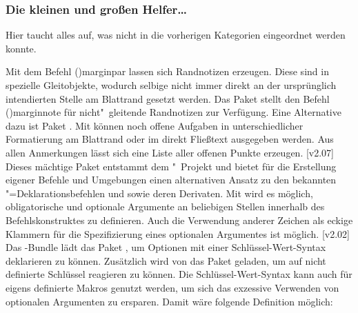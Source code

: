 \subsubsection{Die kleinen und großen Helfer\dots}

Hier taucht alles auf, was nicht in die vorherigen Kategorien eingeordnet 
werden konnte.

\begin{DeclarePackages}
  Mit dem Befehl \Macro(){marginpar} lassen sich 
  Randnotizen erzeugen. Diese sind in  spezielle Gleitobjekte, 
  wodurch selbige nicht immer direkt an der ursprünglich intendierten Stelle am 
  Blattrand gesetzt werden. Das Paket  stellt den Befehl 
  \Macro(){marginnote} für nicht"~gleitende 
  Randnotizen zur Verfügung. Eine Alternative dazu ist Paket .
  Mit  können noch offene Aufgaben in unterschiedlicher 
  Formatierung am Blattrand oder im direkt Fließtext ausgegeben werden. Aus 
  allen Anmerkungen lässt sich eine Liste aller offenen Punkte erzeugen.
  [v2.07]
  Dieses mächtige Paket entstammt dem "~Projekt und bietet 
  für die Erstellung eigener Befehle und Umgebungen einen alternativen Ansatz 
  zu den bekannten "=Deklarationsbefehlen  
  und  sowie deren Derivaten. Mit  wird 
  es möglich, obligatorische und optionale Argumente an beliebigen Stellen 
  innerhalb des Befehlskonstruktes zu definieren. Auch die Verwendung anderer 
  Zeichen als eckige Klammern für die Spezifizierung eines optionalen 
  Argumentes ist möglich.
[v2.02]
  Das \KOMAScript-Bundle lädt das Paket , um Optionen mit 
  einer Schlüssel-Wert-Syntax deklarieren zu können. Zusätzlich wird von 
  \TUDScript das Paket  geladen, um auf nicht definierte 
  Schlüssel reagieren zu können. Die Schlüssel-Wert-Syntax kann auch für 
  eigens definierte Makros genutzt werden, um sich das exzessive Verwenden von 
  optionalen Argumenten zu ersparen. Damit wäre folgende Definition möglich:
  

\end{DeclarePackages}
